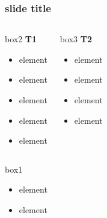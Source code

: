 \documentclass[xcolor=usenames,dvipsnames]{beamer}
\begin{document}
\begin{frame}
\frametitle{slide title}
\begin{columns}
  \begin{beamercolorbox}[shadow=false,rounded=true]{box2}
    { \bf T1}
    \begin{itemize}
    \item element
    \item element
    \item element
    \item element
    \item element
    \end{itemize}
  \end{beamercolorbox}
  \begin{beamercolorbox}[shadow=false,rounded=true]{box3}
    { \bf T2}
    \begin{itemize}
    \item element
    \item element
    \item element
    \item element
    \end{itemize}
  \end{beamercolorbox}
\end{columns}  
\begin{beamercolorbox}[shadow=false,rounded=true]{box1}
  \begin{itemize}
  \item element
  \item element
  \end{itemize}
\end{beamercolorbox}
\end{frame}
\end{document}
